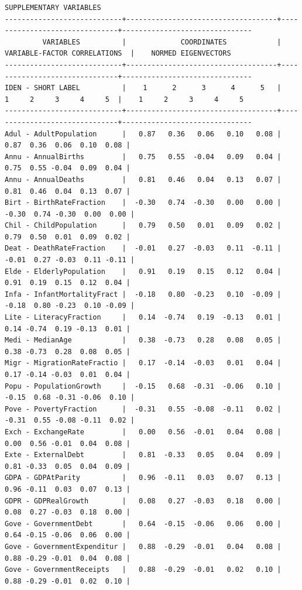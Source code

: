 \documentclass[a4paper,10pt,twocolumn]{article}
\begin{document}
\begin{landscape}
\begin{verbatim}
SUPPLEMENTARY VARIABLES
----------------------------+------------------------------------+-------------------------------+-------------------------------
         VARIABLES          |             COORDINATES            | VARIABLE-FACTOR CORRELATIONS  |    NORMED EIGENVECTORS
----------------------------+------------------------------------+-------------------------------+-------------------------------
IDEN - SHORT LABEL          |    1      2      3      4      5   |    1     2     3     4     5  |    1     2     3     4     5
----------------------------+------------------------------------+-------------------------------+-------------------------------
Adul - AdultPopulation      |   0.87   0.36   0.06   0.10   0.08 |  0.87  0.36  0.06  0.10  0.08 |
Annu - AnnualBirths         |   0.75   0.55  -0.04   0.09   0.04 |  0.75  0.55 -0.04  0.09  0.04 |
Annu - AnnualDeaths         |   0.81   0.46   0.04   0.13   0.07 |  0.81  0.46  0.04  0.13  0.07 |
Birt - BirthRateFraction    |  -0.30   0.74  -0.30   0.00   0.00 | -0.30  0.74 -0.30  0.00  0.00 |
Chil - ChildPopulation      |   0.79   0.50   0.01   0.09   0.02 |  0.79  0.50  0.01  0.09  0.02 |
Deat - DeathRateFraction    |  -0.01   0.27  -0.03   0.11  -0.11 | -0.01  0.27 -0.03  0.11 -0.11 |
Elde - ElderlyPopulation    |   0.91   0.19   0.15   0.12   0.04 |  0.91  0.19  0.15  0.12  0.04 |
Infa - InfantMortalityFract |  -0.18   0.80  -0.23   0.10  -0.09 | -0.18  0.80 -0.23  0.10 -0.09 |
Lite - LiteracyFraction     |   0.14  -0.74   0.19  -0.13   0.01 |  0.14 -0.74  0.19 -0.13  0.01 |
Medi - MedianAge            |   0.38  -0.73   0.28   0.08   0.05 |  0.38 -0.73  0.28  0.08  0.05 |
Migr - MigrationRateFractio |   0.17  -0.14  -0.03   0.01   0.04 |  0.17 -0.14 -0.03  0.01  0.04 |
Popu - PopulationGrowth     |  -0.15   0.68  -0.31  -0.06   0.10 | -0.15  0.68 -0.31 -0.06  0.10 |
Pove - PovertyFraction      |  -0.31   0.55  -0.08  -0.11   0.02 | -0.31  0.55 -0.08 -0.11  0.02 |
Exch - ExchangeRate         |   0.00   0.56  -0.01   0.04   0.08 |  0.00  0.56 -0.01  0.04  0.08 |
Exte - ExternalDebt         |   0.81  -0.33   0.05   0.04   0.09 |  0.81 -0.33  0.05  0.04  0.09 |
GDPA - GDPAtParity          |   0.96  -0.11   0.03   0.07   0.13 |  0.96 -0.11  0.03  0.07  0.13 |
GDPR - GDPRealGrowth        |   0.08   0.27  -0.03   0.18   0.00 |  0.08  0.27 -0.03  0.18  0.00 |
Gove - GovernmentDebt       |   0.64  -0.15  -0.06   0.06   0.00 |  0.64 -0.15 -0.06  0.06  0.00 |
Gove - GovernmentExpenditur |   0.88  -0.29  -0.01   0.04   0.08 |  0.88 -0.29 -0.01  0.04  0.08 |
Gove - GovernmentReceipts   |   0.88  -0.29  -0.01   0.02   0.10 |  0.88 -0.29 -0.01  0.02  0.10 |

\end{verbatim}
\end{landscape}
\end{document}
